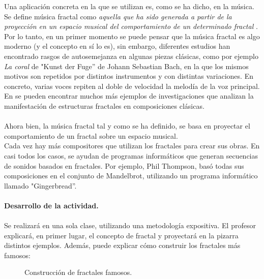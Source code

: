 \documentclass[a4paper, openright, 11pt, titlepage]{report}
\theoremstyle{definition}\newtheorem{defin}[propo]{Definition}
\theoremstyle{definition}\newtheorem{obser}[propo]{Remark}
\theoremstyle{definition}\newtheorem{ejem}[propo]{Ejemplo}
\theoremstyle{definition}\newtheorem{algoritmo}[propo]{Algoritmo}
\begin{document}
\begin{itemize}
    Una aplicación concreta en la que se utilizan es, como se ha dicho, en la música. \\
    Se define música fractal como \textit{aquella que ha sido generada a partir de la proyección en un espacio musical del comportamiento de un determinado fractal} \cite{fractales}. Por lo tanto, en un primer momento se puede pensar que la música fractal es algo moderno (y el concepto en sí lo es), sin embargo, diferentes estudios han encontrado rasgos de autosemejanza en algunas piezas clásicas, como por ejemplo \textit{La coral} de "Kunst der Fuge'' de Johann Sebastian Bach, en la que los mismos motivos son repetidos por distintos instrumentos y con distintas variaciones. En concreto, varias voces repiten al doble de velocidad la melodía de la voz principal.\\
    En \cite{fractales} se pueden encontrar muchos más ejemplos de investigaciones que analizan la manifestación de estructuras fractales en composiciones clásicas.\\\\
    Ahora bien, la música fractal tal y como se ha definido, se basa en proyectar el comportamiento de un fractal sobre un espacio musical.\\
    Cada vez hay más compositores que utilizan los fractales para crear sus obras. En casi todos los casos, se ayudan de programas informáticos que generan secuencias de sonidos basados en fractales. Por ejemplo, Phil Thompson, basó todas sus composiciones en el conjunto de Mandelbrot, utilizando un programa informático llamado "Gingerbread''.\\\\
    \textbf{Desarrollo de la actividad.}\\\\
    Se realizará en una sola clase, utilizando una metodología expositiva. El profesor explicará, en primer lugar, el concepto de fractal y proyectará en la pizarra distintos ejemplos. Además, puede explicar cómo construir los fractales más famosos:
    \begin{figure}[H]
        \centering
         \hspace{1.7cm}
        \caption{Construcción de fractales famosos.}
    \end{figure}
\end{itemize}
\end{document}
